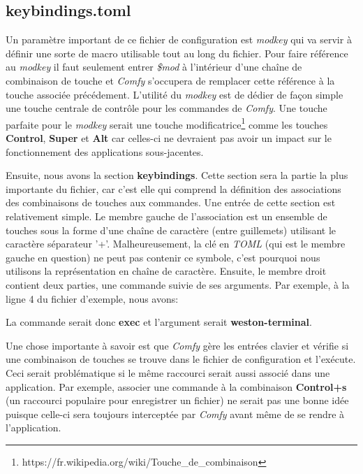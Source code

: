\documentclass[titlepage]{article}
\begin{document}
\subsection{keybindings.toml}
\begin{minipage}{\linewidth}
	
\end{minipage}

\par
Un paramètre important de ce fichier de configuration est \textit{modkey} qui va servir à définir une sorte de macro utilisable tout au long du fichier. Pour faire référence au \textit{modkey} il faut seulement entrer \textit{\$mod} à l'intérieur d'une chaîne de combinaison de touche et \textit{Comfy} s'occupera de remplacer cette référence à la touche associée précédement. L'utilité du \textit{modkey} est de dédier de façon simple une touche centrale de contrôle pour les commandes de \textit{Comfy}. Une touche parfaite pour le \textit{modkey} serait une touche modificatrice\footnote{https://fr.wikipedia.org/wiki/Touche\_de\_combinaison} comme les touches \textbf{Control}, \textbf{Super} et \textbf{Alt} car celles-ci ne devraient pas avoir un impact sur le fonctionnement des applications sous-jacentes.
\par
\bigskip
Ensuite, nous avons la section \textbf{keybindings}. Cette section sera la partie la plus importante du fichier, car c'est elle qui comprend la définition des associations des combinaisons de touches aux commandes. Une entrée de cette section est relativement simple. Le membre gauche de l'association est un ensemble de touches sous la forme d'une chaîne de caractère (entre guillemets) utilisant le caractère séparateur '+'. Malheureusement, la clé en \textit{TOML} (qui est le membre gauche en question) ne peut pas contenir ce symbole, c'est pourquoi nous utilisons la représentation en chaîne de caractère. Ensuite, le membre droit contient deux parties, une commande suivie de ses arguments. Par exemple, à la ligne 4 du fichier d'exemple, nous avons:



La commande serait donc \textbf{exec} et l'argument serait \textbf{weston-terminal}.

\par
\bigskip
Une chose importante à savoir est que \textit{Comfy} gère les entrées clavier et vérifie si une combinaison de touches se trouve dans le fichier de configuration et l'exécute. Ceci serait problématique si le même raccourci serait aussi associé dans une application. Par exemple, associer une commande à la combinaison \textbf{Control+s} (un raccourci populaire pour enregistrer un fichier) ne serait pas une bonne idée puisque celle-ci sera toujours interceptée par \textit{Comfy} avant même de se rendre à l'application.
\end{document}
